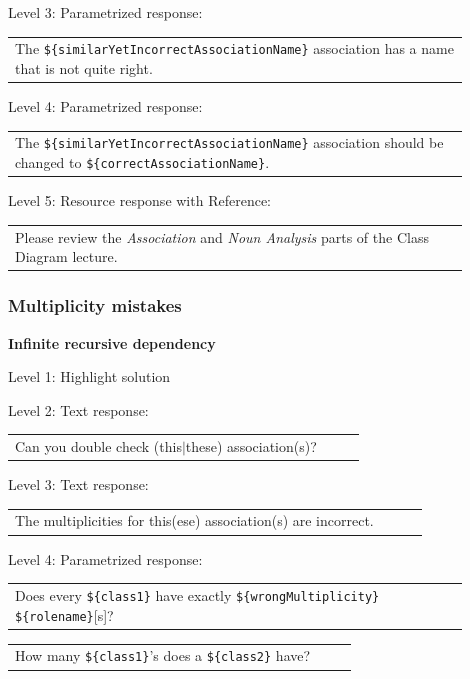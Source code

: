 \noindent Level 3: Parametrized response: \medskip

\begin{tabular}{|p{0.9\linewidth}}
The \verb|${similarYetIncorrectAssociationName}| association has a name that is not quite right.
\end{tabular} \medskip

\noindent Level 4: Parametrized response: \medskip

\begin{tabular}{|p{0.9\linewidth}}
The \verb|${similarYetIncorrectAssociationName}| association should be changed to \verb|${correctAssociationName}|.
\end{tabular} \medskip

\noindent Level 5: Resource response with Reference: \medskip

\begin{tabular}{|p{0.9\linewidth}}
Please review the \textit{Association} and \textit{Noun Analysis} parts of the Class Diagram lecture.
\end{tabular} \medskip


\subsubsection{Multiplicity mistakes}

\noindent \textbf{Infinite recursive dependency} \medskip

\noindent Level 1: Highlight solution \medskip

\noindent Level 2: Text response: \medskip

\begin{tabular}{|p{0.9\linewidth}}
Can you double check (this$|$these) association(s)?
\end{tabular} \medskip

\noindent Level 3: Text response: \medskip

\begin{tabular}{|p{0.9\linewidth}}
The multiplicities for this(ese) association(s) are incorrect.
\end{tabular} \medskip

\noindent Level 4: Parametrized response: \medskip

\begin{tabular}{|p{0.9\linewidth}}
Does every \verb|${class1}| have exactly \verb|${wrongMultiplicity}| \verb|${rolename}|[s]?
\end{tabular} \medskip

\begin{tabular}{|p{0.9\linewidth}}
How many \verb|${class1}|'s does a \verb|${class2}| have?
\end{tabular} \medskip

